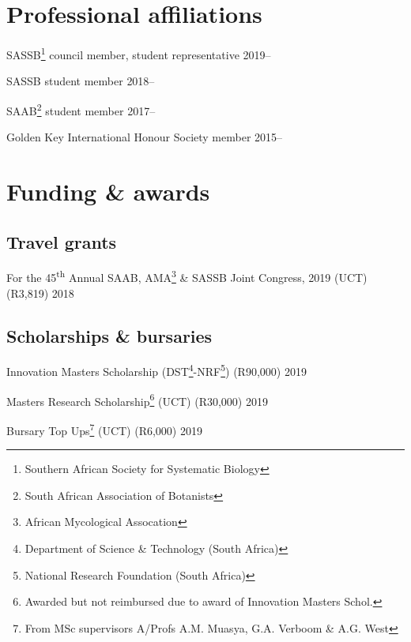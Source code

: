 \documentclass[10pt]{article}
\begin{document}


\section*{Professional affiliations} %

SASSB\footnote{Southern African Society for Systematic Biology} council member, 
student representative                                    \hfill {\small 2019--}

SASSB student member                                      \hfill {\small 2018--}

SAAB\footnote{South African Association of Botanists} student member
                                                          \hfill {\small 2017--}

Golden Key International Honour Society member            \hfill {\small 2015--}

\section*{Funding \& awards} %

\subsection*{Travel grants}

For the 45\textsuperscript{th} Annual SAAB, AMA\footnote{African Mycological Assocation} \& SASSB Joint Congress, 2019 (UCT) (R3,819)    \hfill {\small 2018}

\subsection*{Scholarships \& bursaries}

Innovation Masters Scholarship (DST\footnote{Department of Science \&
Technology (South Africa)}-NRF\footnote{National Research Foundation (South 
Africa)}) (R90,000)                                         \hfill {\small 2019}

Masters Research Scholarship\footnote{Awarded but not reimbursed due to award 
of Innovation Masters Schol.} (UCT) (R30,000)               \hfill {\small 2019}

Bursary Top Ups\footnote{From MSc supervisors A/Profs A.M. Muasya, G.A. Verboom 
\& A.G. West} (UCT) (R6,000)                                \hfill {\small 2019}
\end{document}
